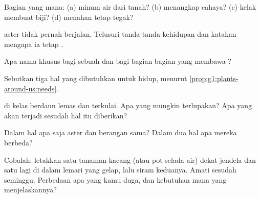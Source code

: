 \begin{exercise}[$\star$]\label{exo:g1:plants-around-us:2}
Bagian  yang mana: (a) minum air dari tanah? (b) menangkap
cahaya? (c) kelak membuat biji? (d) menahan  tetap tegak?
\end{exercise}

\begin{exercise}[$\star$]\label{exo:g1:plants-around-us:3}
 aster tidak pernah berjalan. Telusuri tanda-tanda kehidupan dan
katakan mengapa ia tetap .
\end{exercise}

\begin{exercise}[$\star$]\label{exo:g1:plants-around-us:4}
Apa nama khusus bagi  sebuah  dan bagi bagian-bagian yang
membawa ?
\end{exercise}

\begin{exercise}[$\star$]\label{exo:g1:plants-around-us:5}
Sebutkan tiga hal yang dibutuhkan  untuk hidup, menurut
\cref{prop:g1:plants-around-us:needs}.
\end{exercise}

\begin{exercise}[$\star$]\label{exo:g1:plants-around-us:6}
 di kelas berdaun lemas dan terkulai. Apa yang mungkin
terlupakan? Apa yang akan terjadi sesudah hal itu diberikan?
\end{exercise}

\begin{exercise}[$\star$]\label{exo:g1:plants-around-us:7}
Dalam hal apa saja  aster dan  berangan sama? Dalam dua hal
apa mereka berbeda?
\end{exercise}

\begin{exercise}[$\star$]\label{exo:g1:plants-around-us:8}
Cobalah: letakkan satu tanaman kacang (atau pot selada air) dekat
jendela dan satu lagi di dalam lemari yang gelap, lalu siram keduanya.
Amati sesudah seminggu. Perbedaan apa yang kamu duga, dan kebutuhan
mana yang menjelaskannya?
\end{exercise}

